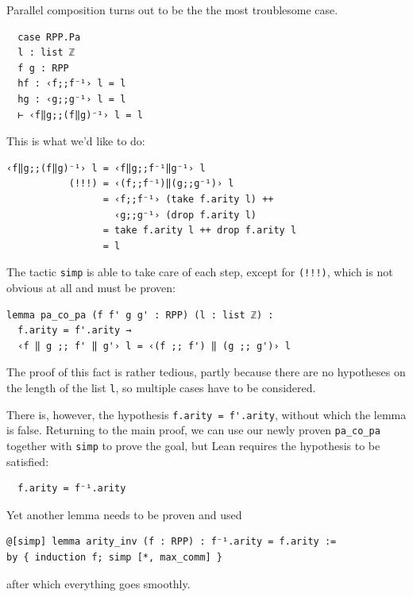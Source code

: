 \documentclass{book}
\theoremstyle{definition}
\theoremstyle{remark}
\theoremstyle{plain}
\begin{document}
Parallel composition turns out to be the the most troublesome case.
\begin{lstlisting}
  case RPP.Pa
  l : list ℤ
  f g : RPP
  hf : ‹f;;f⁻¹› l = l
  hg : ‹g;;g⁻¹› l = l
  ⊢ ‹f‖g;;(f‖g)⁻¹› l = l
\end{lstlisting}
This is what we'd like to do:
\begin{lstlisting}
‹f‖g;;(f‖g)⁻¹› l = ‹f‖g;;f⁻¹‖g⁻¹› l
           (!!!) = ‹(f;;f⁻¹)‖(g;;g⁻¹)› l
                 = ‹f;;f⁻¹› (take f.arity l) ++
                   ‹g;;g⁻¹› (drop f.arity l)
                 = take f.arity l ++ drop f.arity l
                 = l
\end{lstlisting}
The tactic \lstinline{simp} is able to take care of each step, except for \lstinline{(!!!)},
which is not obvious at all and must be proven:
\begin{lstlisting}
lemma pa_co_pa (f f' g g' : RPP) (l : list ℤ) :
  f.arity = f'.arity →
  ‹f ‖ g ;; f' ‖ g'› l = ‹(f ;; f') ‖ (g ;; g')› l
\end{lstlisting}
The proof of this fact is rather tedious, partly because there are no hypotheses on the length of the list \lstinline{l},
so multiple cases have to be considered.

There is, however, the hypothesis \lstinline{f.arity = f'.arity}, without which the lemma is false.
Returning to the main proof, we can use our newly proven \lstinline{pa_co_pa} together with \lstinline{simp} to prove the goal,
but Lean requires the hypothesis to be satisfied:
\begin{lstlisting}
  f.arity = f⁻¹.arity
\end{lstlisting}
Yet another lemma needs to be proven and used
\begin{lstlisting}
@[simp] lemma arity_inv (f : RPP) : f⁻¹.arity = f.arity :=
by { induction f; simp [*, max_comm] }
\end{lstlisting}
after which everything goes smoothly.
\end{document}
